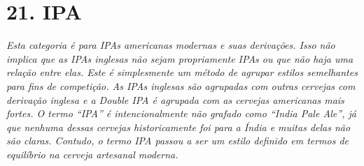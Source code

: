 \section*{21. IPA}
\textit{Esta categoria é para IPAs americanas modernas e suas derivações. Isso não implica que as IPAs inglesas não sejam propriamente IPAs ou que não haja uma relação entre elas. Este é simplesmente um método de agrupar estilos semelhantes para fins de competição. As IPAs inglesas são agrupadas com outras cervejas com derivação inglesa e a Double IPA é agrupada com as cervejas americanas mais fortes. O termo “IPA” é intencionalmente não grafado como “India Pale Ale”, já que nenhuma dessas cervejas historicamente foi para a Índia e muitas delas não são claras. Contudo, o termo IPA passou a ser um estilo definido em termos de equilíbrio na cerveja artesanal moderna.}
